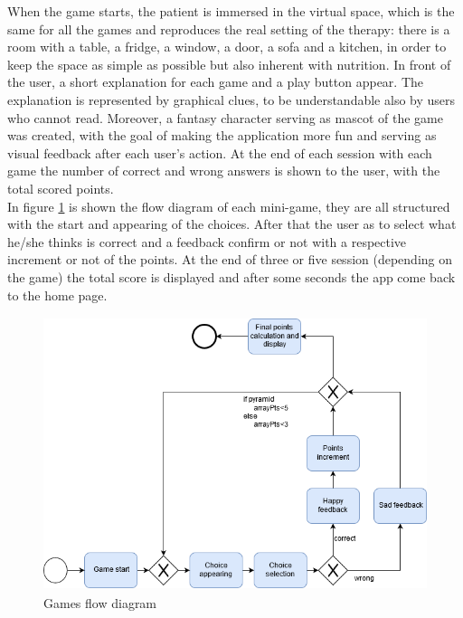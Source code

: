 When the game starts, the patient is immersed in the virtual space, which is the same for all the games and reproduces the real setting of the therapy: there is a room with a table, a fridge, a window, a door, a sofa and a kitchen, in order to keep the space as simple as possible but also inherent with nutrition. In front of the user, a short explanation for each game and a play button appear. The explanation is represented by graphical clues, to be understandable also by users who cannot read. Moreover, a fantasy character serving as mascot of the game was created, with the goal of making the application more fun and serving as visual feedback after each user's action. At the end of each session with each game the number of correct and wrong answers is shown to the user, with the total scored points.\\
In figure \ref{fig:gameflow} is shown the flow diagram of each mini-game, they are all structured with the start and appearing of the choices. After that the user as to select what he/she thinks is correct and a feedback confirm or not with a respective increment or not of the points. At the end of three or five session (depending on the game) the total score is displayed and after some seconds the app come back to the home page.\\
\begin{figure}[H]
\centering
\includegraphics[width=15cm, height=8cm]{immagini/flow2.png}
\caption{Games flow diagram}\label{fig:gameflow}
\end{figure}

